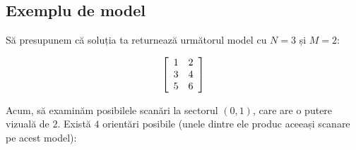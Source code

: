 \documentclass[12pt]{article}
\begin{document}
\subsection{Exemplu de model}


Să presupunem că soluția ta returnează următorul model cu $N=3$ și $M=2$:

\[
\left[
\begin{array}{c c}
1 & 2 \\
3 & 4 \\
5 & 6
\end{array}
\right]
\]


Acum, să examinăm posibilele scanări la sectorul $(0, 1)$, care are o putere vizuală de $2$. Există $4$ orientări posibile (unele dintre ele produc aceeași scanare pe acest model):
\end{document}
